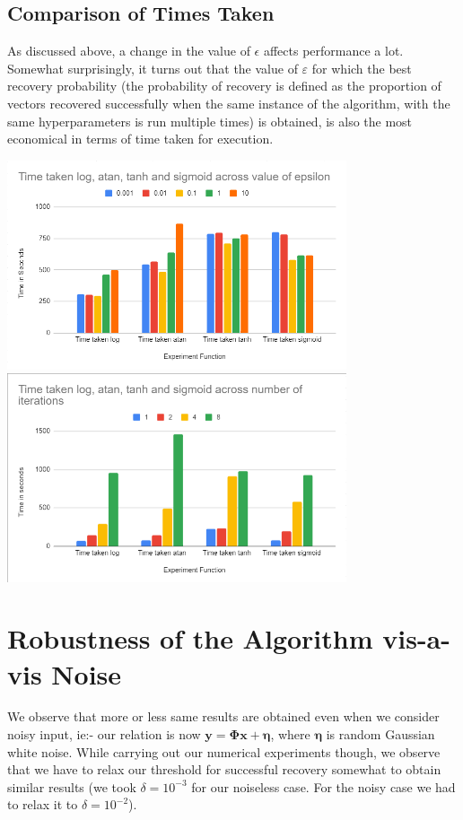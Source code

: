 \documentclass[a4paper,14pt]{article}
\numberwithin{definition}{section}
\numberwithin{mytheorem}{subsection}
\begin{document}
\subsection{Comparison of Times Taken}
As discussed above, a change in the value of $\epsilon$ affects performance a lot. Somewhat surprisingly, it turns out that the value of $\varepsilon$ for which the best recovery probability (the probability of recovery is defined as the proportion of vectors recovered successfully when the same instance of the algorithm, with the same hyperparameters is run multiple times) is obtained, is also the most economical in terms of time taken for execution.

\begin{center}
    \includegraphics[width=10cm]{time_epsilon.png}
    \includegraphics[width=10cm]{time_iterations.png}
\end{center}


\section{Robustness of the Algorithm vis-a-vis Noise}
We observe that more or less same results are obtained even when we consider noisy input, ie:- our relation is now $\boldsymbol{y = \Phi x + \eta}$, where $\boldsymbol{\eta}$ is random Gaussian white noise. While carrying out our numerical experiments though, we observe that we have to relax our threshold for successful recovery somewhat to obtain similar results (we took $\delta = 10^{-3}$ for our noiseless case. For the noisy case we had to relax it to $\delta = 10^{-2}$).
\end{document}
